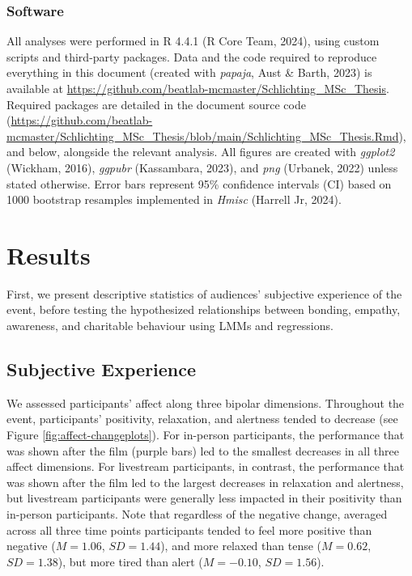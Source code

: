 \documentclass[
  man,floatsintext]{apa6}
\begin{document}
\subsubsection{Software}\label{software}

All analyses were performed in R 4.4.1 (R Core Team, 2024), using custom scripts and third-party packages. Data and the code required to reproduce everything in this document (created with \emph{papaja}, Aust \& Barth, 2023) is available at \url{https://github.com/beatlab-mcmaster/Schlichting_MSc_Thesis}. Required packages are detailed in the document source code (\url{https://github.com/beatlab-mcmaster/Schlichting_MSc_Thesis/blob/main/Schlichting_MSc_Thesis.Rmd}), and below, alongside the relevant analysis. All figures are created with \emph{ggplot2} (Wickham, 2016), \emph{ggpubr} (Kassambara, 2023), and \emph{png} (Urbanek, 2022) unless stated otherwise. Error bars represent 95\% confidence intervals (CI) based on 1000 bootstrap resamples implemented in \emph{Hmisc} (Harrell Jr, 2024).

\section{Results}\label{results}

First, we present descriptive statistics of audiences' subjective experience of the event, before testing the hypothesized relationships between bonding, empathy, awareness, and charitable behaviour using LMMs and regressions.

\subsection{Subjective Experience}\label{subjective-experience-1}

We assessed participants' affect along three bipolar dimensions. Throughout the event, participants' positivity, relaxation, and alertness tended to decrease (see Figure \ref{fig:affect-changeplots}). For in-person participants, the performance that was shown after the film (purple bars) led to the smallest decreases in all three affect dimensions. For livestream participants, in contrast, the performance that was shown after the film led to the largest decreases in relaxation and alertness, but livestream participants were generally less impacted in their positivity than in-person participants. Note that regardless of the negative change, averaged across all three time points participants tended to feel more positive than negative (\(M = 1.06\), \(SD = 1.44\)), and more relaxed than tense (\(M = 0.62\), \(SD = 1.38\)), but more tired than alert (\(M = -0.10\), \(SD = 1.56\)).
\end{document}
